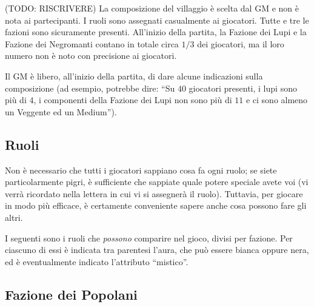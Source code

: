 \documentclass[a4paper,10pt]{article}
\begin{document}
(TODO: RISCRIVERE)
La composizione del villaggio è scelta dal GM e non è nota ai partecipanti. I ruoli sono assegnati casualmente ai giocatori.
Tutte e tre le fazioni sono sicuramente presenti. All'inizio della partita, la Fazione dei Lupi e la Fazione dei Negromanti contano in totale circa $1/3$ dei giocatori, ma il loro numero non è noto con precisione ai giocatori.

Il GM è libero, all'inizio della partita, di dare alcune indicazioni sulla composizione (ad esempio, potrebbe dire: ``Su $40$ giocatori presenti, i lupi sono più di $4$, i componenti della Fazione dei Lupi non sono più di $11$ e ci sono almeno un Veggente ed un Medium'').


\subsection{Ruoli}

Non è necessario che tutti i giocatori sappiano cosa fa ogni ruolo; se siete particolarmente pigri, è sufficiente che sappiate quale potere speciale avete voi (vi verrà ricordato nella lettera in cui vi si assegnerà il ruolo). Tuttavia, per giocare in modo più efficace, è certamente conveniente sapere anche cosa possono fare gli altri.


I seguenti sono i ruoli che \emph{possono} comparire nel gioco, divisi per fazione.
Per ciascuno di essi è indicata tra parentesi l'aura, che può essere bianca oppure nera, ed è eventualmente indicato l'attributo ``mistico''.


\subsection*{Fazione dei Popolani}
\end{document}
